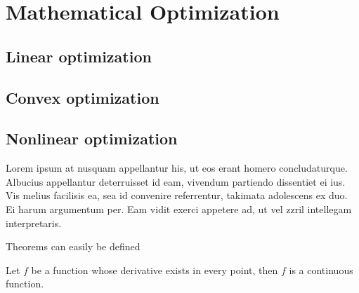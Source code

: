 
\chapter{Mathematical Optimization}

\section{Linear optimization}
\section{Convex optimization}
\section{Nonlinear optimization}


Lorem ipsum at nusquam appellantur his, ut eos erant homero
concludaturque. Albucius appellantur deterruisset id eam, vivendum
partiendo dissentiet ei ius. Vis melius facilisis ea, sea id convenire
referrentur, takimata adolescens ex duo. Ei harum argumentum per. Eam
vidit exerci appetere ad, ut vel zzril intellegam interpretaris.

Theorems can easily be defined

\begin{definition}
  Let $f$ be a function whose derivative exists in every point, then $f$ is 
  a continuous function.
\end{definition}

